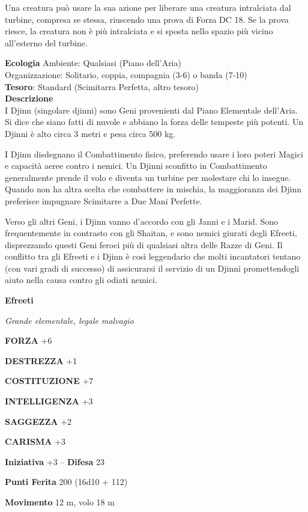 \begin{multicols}{2}
	Una creatura può usare la sua azione per liberare una creatura intralciata dal turbine, compresa se stessa, riuscendo una prova di Forza DC 18. Se la prova riesce, la creatura non è più intralciata e si sposta nello spazio più vicino all'esterno del turbine.

	\textbf{Ecologia}
	Ambiente: Qualsiasi (Piano dell'Aria)\\
	Organizzazione: Solitario, coppia, compagnia (3-6) o banda (7-10)\\
	\textbf{Tesoro}: Standard (Scimitarra Perfetta, altro tesoro)\\
	\textbf{Descrizione}\\
	I Djinn (singolare djinni) sono Geni provenienti dal Piano Elementale dell'Aria. Si dice che siano fatti di nuvole e abbiano la forza delle tempeste più potenti. Un Djinni è alto circa 3 metri e pesa circa 500 kg.

	I Djinn disdegnano il Combattimento fisico, preferendo usare i loro poteri Magici e capacità aeree contro i nemici. Un Djinni sconfitto in Combattimento generalmente prende il volo e diventa un turbine per molestare chi lo insegue. Quando non ha altra scelta che combattere in mischia, la maggioranza dei Djinn preferisce impugnare Scimitarre a Due Mani Perfette.

	Verso gli altri Geni, i Djinn vanno d'accordo con gli Janni e i Marid. Sono frequentemente in contrasto con gli Shaitan, e sono nemici giurati degli Efreeti, disprezzando questi Geni feroci più di qualsiasi altra delle Razze di Geni. Il conflitto tra gli Efreeti e i Djinn è così leggendario che molti incantatori tentano (con vari gradi di successo) di assicurarsi il servizio di un Djinni promettendogli aiuto nella causa contro gli odiati nemici.


	\medskip{}\textbf{Efreeti}

	\textit{Grande elementale, legale malvagio}

	\textbf{FORZA} +6

	\textbf{DESTREZZA} +1

	\textbf{COSTITUZIONE} +7

	\textbf{INTELLIGENZA} +3

	\textbf{SAGGEZZA} +2

	\textbf{CARISMA} +3

	\textbf{Iniziativa} +3 -- \textbf{Difesa} 23

	\textbf{Punti Ferita} 200 (16d10 + 112)

	\textbf{Movimento} 12 m, volo 18 m


\end{multicols}
